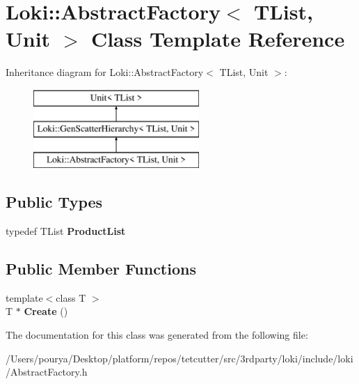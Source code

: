 \hypertarget{classLoki_1_1AbstractFactory}{}\section{Loki\+:\+:Abstract\+Factory$<$ T\+List, Unit $>$ Class Template Reference}
\label{classLoki_1_1AbstractFactory}
Inheritance diagram for Loki\+:\+:Abstract\+Factory$<$ T\+List, Unit $>$\+:\begin{figure}[H]
\begin{center}
\leavevmode
\includegraphics[height=3.000000cm]{classLoki_1_1AbstractFactory}
\end{center}
\end{figure}
\subsection*{Public Types}
\begin{DoxyCompactItemize}
\item 
\hypertarget{classLoki_1_1AbstractFactory_ae0ac6a42411023e6698d9936e49fd417}{}typedef T\+List {\bfseries Product\+List}\label{classLoki_1_1AbstractFactory_ae0ac6a42411023e6698d9936e49fd417}

\end{DoxyCompactItemize}
\subsection*{Public Member Functions}
\begin{DoxyCompactItemize}
\item 
\hypertarget{classLoki_1_1AbstractFactory_abcdc71244f308067d68a76870108ab8a}{}{\footnotesize template$<$class T $>$ }\\T $\ast$ {\bfseries Create} ()\label{classLoki_1_1AbstractFactory_abcdc71244f308067d68a76870108ab8a}

\end{DoxyCompactItemize}


The documentation for this class was generated from the following file\+:\begin{DoxyCompactItemize}
\item 
/\+Users/pourya/\+Desktop/platform/repos/tetcutter/src/3rdparty/loki/include/loki/Abstract\+Factory.\+h\end{DoxyCompactItemize}
